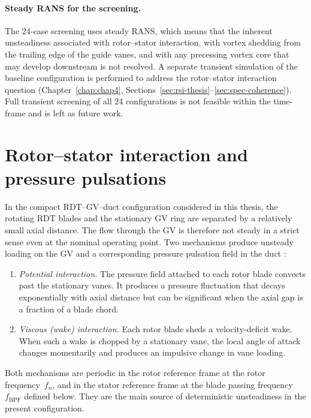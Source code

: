 \paragraph{Steady RANS for the screening.} The 24-case screening uses steady RANS, which means that the inherent unsteadiness associated with rotor--stator interaction, with vortex shedding from the trailing edge of the guide vanes, and with any precessing vortex core that may develop downstream is not resolved. A separate transient simulation of the baseline configuration is performed to address the rotor--stator interaction question (Chapter~\ref{chap:chap4}, Sections~\ref{sec:rsi-thesis}--\ref{sec:spec-coherence}). Full transient screening of all 24 configurations is not feasible within the time-frame and is left as future work.

\section{Rotor--stator interaction and pressure pulsations}
\label{sec:rsi}
 
In the compact RDT--GV--duct configuration considered in
this thesis, the rotating RDT blades and the stationary GV
ring are separated by a relatively small axial distance. The flow
through the GV is therefore not steady in a strict sense even
at the nominal operating point. Two mechanisms produce unsteady
loading on the GV and a corresponding pressure pulsation field
in the duct \cite{Brekke2015, Arndt1990}:
\begin{enumerate}
  \item \emph{Potential interaction.} The pressure field attached to
        each rotor blade convects past the stationary vanes. It
        produces a pressure fluctuation that decays exponentially
        with axial distance but can be significant when the axial
        gap is a fraction of a blade chord.
  \item \emph{Viscous (wake) interaction.} Each rotor blade sheds a
        velocity-deficit wake. When such a wake is chopped by a
        stationary vane, the local angle of attack changes
        momentarily and produces an impulsive change in vane loading.
\end{enumerate}
Both mechanisms are periodic in the rotor reference frame at the
rotor frequency~$f_n$, and in the stator reference frame at the
blade passing frequency~$f_{\mathrm{BPF}}$ defined below. They are
the main source of deterministic unsteadiness in the present
configuration.
 
